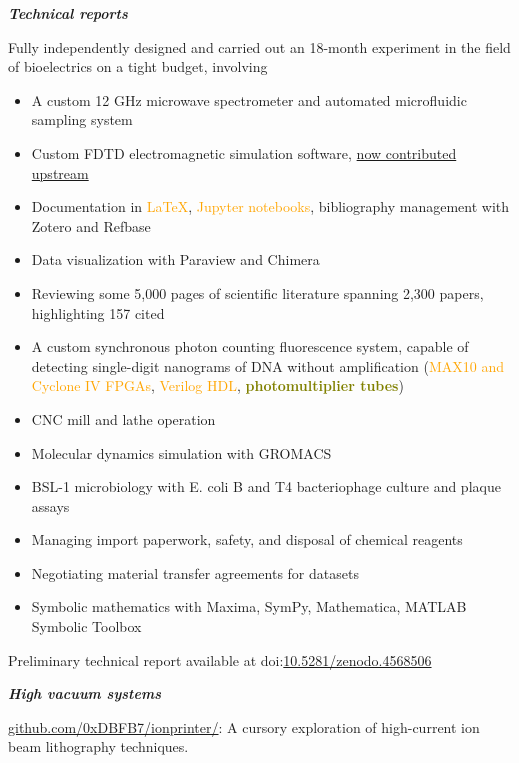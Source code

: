 \documentclass[fleqn,11pt]{article}
\newcommand{\ressection}[1]{\textbf{{\Large \textit{#1}}}\xrfill[0.1ex]{0.6pt}}
\newcommand{\sk}[1]{\textcolor{orange}{#1}}
\newcommand{\tec}[1]{\textcolor{olive}{\textbf{#1}}}
\newcommand{\itemoptions}{\setlength{\itemindent}{-10pt} \setlength\itemsep{-1em}}
\begin{document}
\ressection{Technical reports}

Fully independently designed and carried out an 18-month experiment in the field of bioelectrics on a tight budget, involving
\begin{itemize}\itemoptions
\item A custom 12 GHz microwave spectrometer and automated microfluidic sampling system
\item Custom FDTD electromagnetic simulation software, \href{https://github.com/flaport/fdtd/pull/27}{now contributed upstream} 
\item Documentation in \sk{LaTeX}, \sk{Jupyter notebooks}, bibliography management with Zotero and Refbase
\item Data visualization with Paraview and Chimera
\item Reviewing some 5,000 pages of scientific literature spanning 2,300 papers, highlighting 157 cited
\item A custom synchronous photon counting fluorescence system, capable of detecting single-digit nanograms of DNA without amplification (\sk{MAX10 and Cyclone IV FPGAs}, \sk{Verilog HDL}, \tec{photomultiplier tubes})
\item CNC mill and lathe operation
\item Molecular dynamics simulation with GROMACS
\item BSL-1 microbiology with E. coli B and T4 bacteriophage culture and plaque assays
\item Managing import paperwork, safety, and disposal of chemical reagents
\item Negotiating material transfer agreements for datasets
\item Symbolic mathematics with Maxima, SymPy, Mathematica, MATLAB Symbolic Toolbox
\end{itemize}

Preliminary technical report available at doi:\href{https://doi.org/10.5281/zenodo.4568506}{10.5281/zenodo.4568506}
\pagebreak

\ressection{High vacuum systems}

\href{https://github.com/0xDBFB7/ionprinter/}{github.com/0xDBFB7/ionprinter/}: A cursory exploration of high-current ion beam lithography techniques. 
\end{document}
